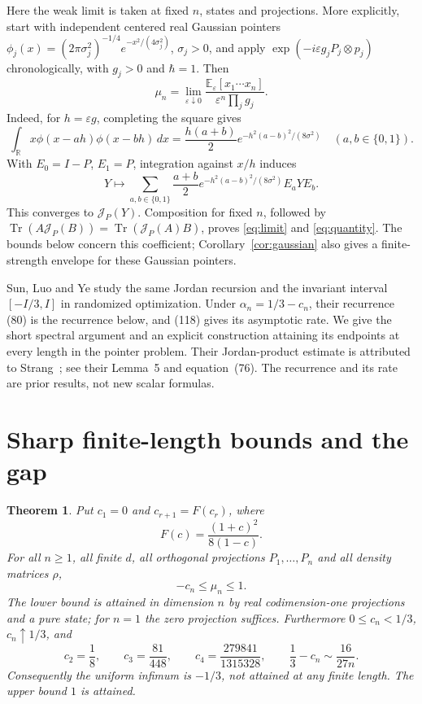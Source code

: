 \documentclass[11pt,a4paper]{article}
\newtheorem{theorem}{Theorem}
\newcommand{\Id}{I}
\newcommand{\tr}{\operatorname{Tr}}
\newcommand{\J}{\mathcal J}
\begin{document}
Here the weak limit is taken at fixed $n$, states and projections. More
explicitly, start with independent centered real Gaussian pointers
$\phi_j(x)=(2\pi\sigma_j^2)^{-1/4}e^{-x^2/(4\sigma_j^2)}$, $\sigma_j>0$,
and apply $\exp(-i\varepsilon g_jP_j\otimes p_j)$ chronologically, with
$g_j>0$ and $\hbar=1$. Then
\begin{equation}\label{eq:limit}
 \mu_n=\lim_{\varepsilon\downarrow0}
 \frac{\mathbb E_\varepsilon[x_1\cdots x_n]}
 {\varepsilon^n\prod_jg_j}.
\end{equation}
Indeed, for $h=\varepsilon g$, completing the square gives
\[
 \int_{\mathbb R}x\phi(x-ah)\phi(x-bh)\,dx
 =\frac{h(a+b)}2e^{-h^2(a-b)^2/(8\sigma^2)}\quad(a,b\in\{0,1\}).
\]
With $E_0=\Id-P$, $E_1=P$, integration against $x/h$ induces
\[
 Y\longmapsto\sum_{a,b\in\{0,1\}}
 \frac{a+b}{2}e^{-h^2(a-b)^2/(8\sigma^2)}E_aYE_b.
\]
This converges to $\J_P(Y)$. Composition for fixed $n$, followed by
$\tr(A\J_P(B))=\tr(\J_P(A)B)$, proves
\eqref{eq:limit} and \eqref{eq:quantity}. The bounds below concern this
coefficient; Corollary~\ref{cor:gaussian} also gives a finite-strength envelope
for these Gaussian pointers.

Sun, Luo and Ye \cite[Sections~6.2 and~6.4; equations (78), (80), (118)
of arXiv:1503.06387v3]{sun} study the same Jordan recursion and the
invariant interval $[-\Id/3,\Id]$ in randomized optimization.
Under $\alpha_n=1/3-c_n$, their recurrence (80) is the recurrence below,
and (118) gives its asymptotic rate. We give the short spectral argument
and an explicit construction attaining its endpoints at every length
in the pointer problem. Their Jordan-product estimate is attributed to
Strang~\cite{strang}; see their Lemma~5 and equation~(76).
The recurrence and its rate are prior results, not new scalar formulas.

\section{Sharp finite-length bounds and the gap}

\begin{theorem}\label{thm:main}
Put $c_1=0$ and $c_{r+1}=F(c_r)$, where
\[
 F(c)=\frac{(1+c)^2}{8(1-c)}.
\]
For all $n\geq1$, all finite $d$, all orthogonal projections
$P_1,\ldots,P_n$ and all density matrices $\rho$,
\[
 -c_n\leq\mu_n\leq1.
\]
The lower bound is attained in dimension $n$ by real codimension-one
projections and a pure state; for $n=1$ the zero projection suffices.
Furthermore $0\leq c_n<1/3$, $c_n\uparrow1/3$, and
\[
 c_2=\frac18,\qquad c_3=\frac{81}{448},\qquad
 c_4=\frac{279841}{1315328},\qquad
 \frac13-c_n\sim\frac{16}{27n}.
\]
Consequently the uniform infimum is $-1/3$, not attained at any finite
length. The upper bound $1$ is attained.
\end{theorem}
\end{document}
